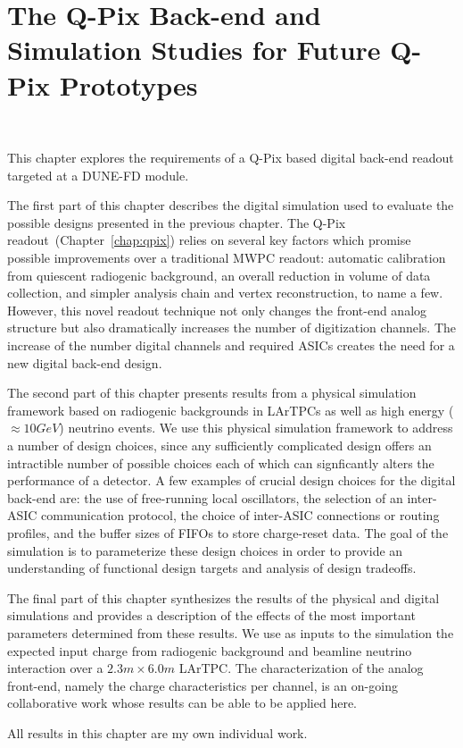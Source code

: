 \chapter{The Q-Pix Back-end and Simulation Studies for Future Q-Pix Prototypes}~\label{chap:sim}

This chapter explores the requirements of a Q-Pix based digital back-end readout targeted at a DUNE-FD module.

The first part of this chapter describes the digital simulation used to evaluate the possible designs presented in the previous chapter.
The Q-Pix readout~(Chapter~\ref{chap:qpix}) relies on several key factors which promise possible improvements over a traditional MWPC readout: automatic calibration from quiescent radiogenic background, an overall reduction in volume of data collection, and simpler analysis chain and vertex reconstruction, to name a few.
However, this novel readout technique not only changes the front-end analog structure but also dramatically increases the number of digitization channels.
The increase of the number digital channels and required ASICs creates the need for a new digital back-end design.

The second part of this chapter presents results from a physical simulation framework based on radiogenic backgrounds in LArTPCs as well as high energy ($\approx 10\unit{GeV}$) neutrino events.
We use this physical simulation framework to address a number of design choices, since any sufficiently complicated design offers an intractible number of possible choices each of which can signficantly alters the performance of a detector.
A few examples of crucial design choices for the digital back-end are: the use of free-running local oscillators, the selection of an inter-ASIC communication protocol, the choice of inter-ASIC connections or routing profiles, and the buffer sizes of FIFOs to store charge-reset data.
The goal of the simulation is to parameterize these design choices in order to provide an understanding of functional design targets and analysis of design tradeoffs.

The final part of this chapter synthesizes the results of the physical and digital simulations and provides a description of the effects of the most important parameters determined from these results.
We use as inputs to the simulation the expected input charge from radiogenic background and beamline neutrino interaction over a $2.3 \unit{m} \times 6.0 \unit{m}$ LArTPC.
The characterization of the analog front-end, namely the charge characteristics per channel, is an on-going collaborative work whose results can be able to be applied here.

All results in this chapter are my own individual work.







